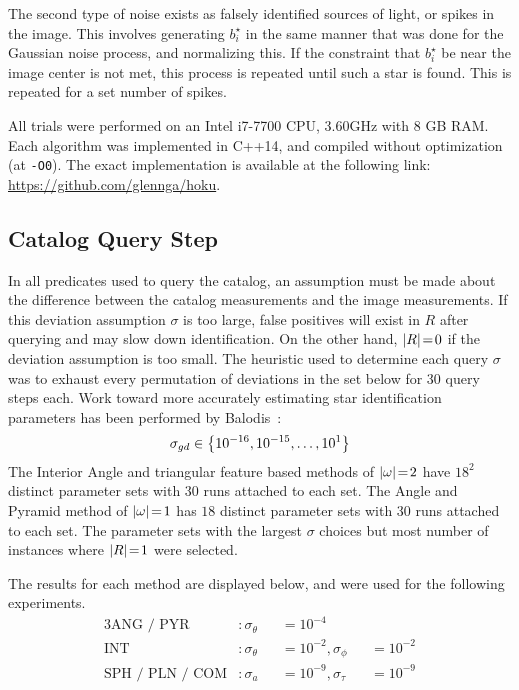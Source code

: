 The second type of noise exists as falsely identified sources of light, or spikes in the image.
This involves generating $b^\star_i$ in the same manner that was done for the Gaussian noise process, and normalizing
this.
If the constraint that $b^\star_i$ be near the image center is not met, this process is repeated until such a star is
found.
This is repeated for a set number of spikes.

All trials were performed on an Intel i7-7700 CPU, 3.60GHz with 8 GB RAM\@.
Each algorithm was implemented in C++14, and compiled without optimization (at \texttt{-O0}).
The exact implementation is available at the following link:
\url{https://github.com/glennga/hoku}.

\subsection{Catalog Query Step}\label{subsec:catalogQueryStep}
In all predicates used to query the catalog, an assumption must be made about the difference between the catalog
measurements and the image measurements.
If this deviation assumption $\sigma$ is too large, false positives will exist in $R$ after querying and may slow
down identification.
On the other hand, $\left| R \right| \!=\! 0$ if the deviation assumption is too small.
The heuristic used to determine each query $\sigma$ was to exhaust every permutation of deviations in the set below for
30 query steps each.
Work toward more accurately estimating star identification parameters has been performed by
Balodis~\cite{balodis:parametersAutomated}:
\begin{equation}
    \sigma_{gd} \in \left\{  10^{-16}, 10^{-15}, \ldots, 10^1  \right\}
\end{equation}
The Interior Angle and triangular feature based methods of $\left| \omega \right| \!=\! 2$ have $18^2$ distinct parameter sets
with 30 runs attached to each set.
The Angle and Pyramid method of $\left| \omega \right| \!=\! 1$ has $18$ distinct parameter sets with 30 runs attached to each set.
The parameter sets with the largest $\sigma$ choices but most number of instances where $\left| R \right| \!=\! 1$ were selected.

The results for each method are displayed below, and were used for the following experiments.
\begin{alignat*}{3}
    \text{ANG / PYR}&: \sigma_\theta &&= 10^{-4} &&{}\\
    \text{INT}&: \sigma_\theta &&= 10^{-2}, \sigma_\phi &&= 10^{-2} \\
    \text{SPH / PLN / COM}&: \sigma_a &&= 10^{-9}, \sigma_\tau &&= 10^{-9}
\end{alignat*}

